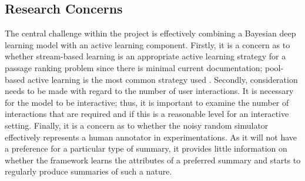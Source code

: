 \subsection{Research Concerns}
\label{chap:introduction:prop_approach:concerns}

The central challenge within the project is effectively combining a Bayesian deep learning model with an active learning component. Firstly, it is a concern as to whether stream-based learning is an appropriate active learning strategy for a passage ranking problem since there is minimal current documentation; pool-based active learning is the most common strategy used \cite{Settles09}. Secondly, consideration needs to be made with regard to the number of user interactions. It is necessary for the model to be interactive; thus, it is important to examine the number of interactions that are required and if this is a reasonable level for an interactive setting. Finally, it is a concern as to whether the noisy random simulator effectively represents a human annotator in experimentations. As it will not have a preference for a particular type of summary, it provides little information on whether the framework learns the attributes of a preferred summary and starts to regularly produce summaries of such a nature.
		
		

		
